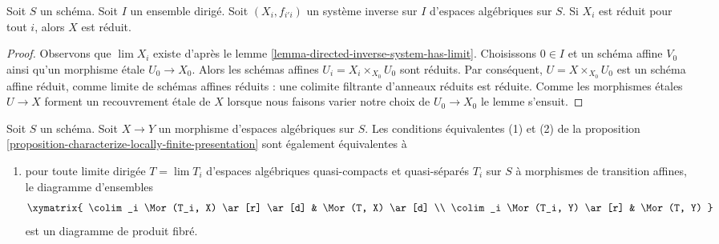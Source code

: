 \begin{lemma}
\label{lemma-directed-inverse-system-reduced}
Soit $S$ un schéma. Soit $I$ un ensemble dirigé.
Soit $(X_i, f_{i'i})$ un système inverse sur $I$
d'espaces algébriques sur $S$. Si $X_i$ est réduit
pour tout $i$, alors $X$ est réduit.
\end{lemma}

\begin{proof}
Observons que $\lim X_i$ existe d'après
le lemme \ref{lemma-directed-inverse-system-has-limit}.
Choisissons $0 \in I$ et un schéma affine $V_0$ ainsi qu'un morphisme \'etale
$U_0 \to X_0$. Alors les schémas affines
$U_i = X_i \times_{X_0} U_0$ sont réduits.
Par conséquent, $U = X \times_{X_0} U_0$
est un schéma affine réduit, comme limite de schémas affines réduits :
une colimite filtrante d'anneaux réduits est réduite.
Comme les morphismes \'etales $U \to X$ forment un
recouvrement \'etale de $X$ lorsque nous faisons varier notre choix de $U_0 \to X_0$
le lemme s'ensuit.
\end{proof}

\begin{lemma}
\label{lemma-better-characterize-relative-limit-preserving}
Soit $S$ un schéma. Soit $X \to Y$ un morphisme d'espaces algébriques
sur $S$. Les conditions équivalentes (1) et (2) de la
proposition \ref{proposition-characterize-locally-finite-presentation}
sont également équivalentes à
\begin{enumerate}
\item[(3)] pour toute limite dirigée $T = \lim T_i$ d'espaces algébriques quasi-compacts
et quasi-séparés $T_i$ sur $S$ à morphismes de transition affines, le diagramme
d'ensembles
$$
\xymatrix{
\colim_i \Mor(T_i, X) \ar[r] \ar[d] & \Mor(T, X) \ar[d] \\
\colim_i \Mor(T_i, Y) \ar[r] & \Mor(T, Y)
}
$$
est un diagramme de produit fibré.
\end{enumerate}
\end{lemma}

